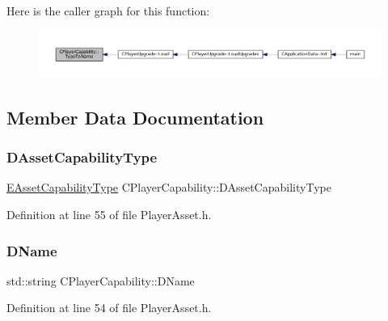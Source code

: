Here is the caller graph for this function\+:
\nopagebreak
\begin{figure}[H]
\begin{center}
\leavevmode
\includegraphics[width=350pt]{classCPlayerCapability_a976f05b7e620b721bdb5051debc9b93d_icgraph}
\end{center}
\end{figure}


\subsection{Member Data Documentation}
\hypertarget{classCPlayerCapability_a09011bc8c74c698bfb65f06a1840c6e1}{}\label{classCPlayerCapability_a09011bc8c74c698bfb65f06a1840c6e1} 
\subsubsection{\texorpdfstring{D\+Asset\+Capability\+Type}{DAssetCapabilityType}}
{\footnotesize\ttfamily \hyperlink{GameDataTypes_8h_a35b98ce26aca678b03c6f9f76e4778ce}{E\+Asset\+Capability\+Type} C\+Player\+Capability\+::\+D\+Asset\+Capability\+Type\hspace{0.3cm}{\ttfamily [protected]}}



Definition at line 55 of file Player\+Asset.\+h.

\hypertarget{classCPlayerCapability_aae795f4ae4c19a9c7792a4101ca18560}{}\label{classCPlayerCapability_aae795f4ae4c19a9c7792a4101ca18560} 
\subsubsection{\texorpdfstring{D\+Name}{DName}}
{\footnotesize\ttfamily std\+::string C\+Player\+Capability\+::\+D\+Name\hspace{0.3cm}{\ttfamily [protected]}}



Definition at line 54 of file Player\+Asset.\+h.

